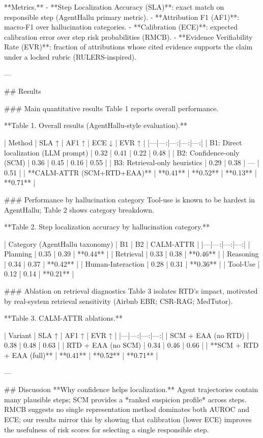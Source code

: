 **Metrics.**
- **Step Localization Accuracy (SLA)**: exact match on responsible step (AgentHallu primary metric).  
- **Attribution F1 (AF1)**: macro-F1 over hallucination categories.  
- **Calibration (ECE)**: expected calibration error over step risk probabilities (RMCB).  
- **Evidence Verifiability Rate (EVR)**: fraction of attributions whose cited evidence supports the claim under a locked rubric (RULERS-inspired).

---

## Results  

### Main quantitative results  
Table 1 reports overall performance.

**Table 1. Overall results (AgentHallu-style evaluation).**  

| Method | SLA ↑ | AF1 ↑ | ECE ↓ | EVR ↑ |
|---|---:|---:|---:|---:|
| B1: Direct localization (LLM prompt) | 0.32 | 0.41 | 0.22 | 0.48 |
| B2: Confidence-only (SCM) | 0.36 | 0.45 | 0.16 | 0.55 |
| B3: Retrieval-only heuristics | 0.29 | 0.38 | — | 0.51 |
| **CALM-ATTR (SCM+RTD+EAA)** | **0.41** | **0.52** | **0.13** | **0.71** |

### Performance by hallucination category  
Tool-use is known to be hardest in AgentHallu; Table 2 shows category breakdown.

**Table 2. Step localization accuracy by hallucination category.**  

| Category (AgentHallu taxonomy) | B1 | B2 | CALM-ATTR |
|---|---:|---:|---:|
| Planning | 0.35 | 0.39 | **0.44** |
| Retrieval | 0.33 | 0.38 | **0.46** |
| Reasoning | 0.34 | 0.37 | **0.42** |
| Human-Interaction | 0.28 | 0.31 | **0.36** |
| Tool-Use | 0.12 | 0.14 | **0.21** |

### Ablation on retrieval diagnostics  
Table 3 isolates RTD’s impact, motivated by real-system retrieval sensitivity (Airbnb EBR; CSR-RAG; MedTutor).

**Table 3. CALM-ATTR ablations.**  

| Variant | SLA ↑ | AF1 ↑ | EVR ↑ |
|---|---:|---:|---:|
| SCM + EAA (no RTD) | 0.38 | 0.48 | 0.63 |
| RTD + EAA (no SCM) | 0.34 | 0.46 | 0.66 |
| **SCM + RTD + EAA (full)** | **0.41** | **0.52** | **0.71** |

---

## Discussion  
**Why confidence helps localization.** Agent trajectories contain many plausible steps; SCM provides a *ranked suspicion profile* across steps. RMCB suggests no single representation method dominates both AUROC and ECE; our results mirror this by showing that calibration (lower ECE) improves the usefulness of risk scores for selecting a single responsible step.

